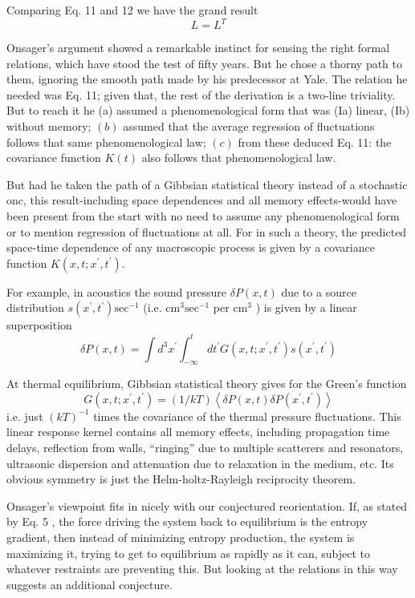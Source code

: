 \documentclass{article}
\begin{document}
Comparing Eq. 11 and 12 we have the grand result
$$
L=L^T
$$

Onsager's argument showed a remarkable instinct for sensing the right formal relations, which have stood the test of fifty years. But he chose a thorny path to them, ignoring the smooth path made by his predecessor at Yale. The relation he needed was Eq. 11; given that, the rest of the derivation is a two-line triviality. But to reach it he (a) assumed a phenomenological form that was (Ia) linear, (Ib) without memory; $(b)$ assumed that the average regression of fluctuations follows that same phenomenological law; $(c)$ from these deduced Eq. 11: the covariance function $K(t)$ also follows that phenomenological law.

But had he taken the path of a Gibbsian statistical theory instead of a stochastic onc, this result-including space dependences and all memory effects-would have been present from the start with no need to assume any phenomenological form or to mention regression of fluctuations at all. For in such a theory, the predicted space-time dependence of any macroscopic process is given by a covariance function $K\left(x, t ; x^{\prime}, t^{\prime}\right)$.

For example, in acoustics the sound pressure $\delta P(x, t)$ due to a source distribution $s\left(x^{\prime}, t^{\prime}\right) \mathrm{sec}^{-1}$ (i.e. $\mathrm{cm}^3 \mathrm{sec}^{-1}$ per $\mathrm{cm}^3$ ) is given by a linear superposition
$$
\delta P(x, t)=\int d^3 x^{\prime} \int_{-\infty}^t d t^{\prime} G\left(x, t ; x^{\prime}, t^{\prime}\right) s\left(x^{\prime}, t^{\prime}\right)
$$

At thermal equilibrium, Gibbsian statistical theory gives for the Green's function
$$
G\left(x, t ; x^{\prime}, t^{\prime}\right)=(1 / k T)\left\langle\delta P(x, t) \delta P\left(x^{\prime}, t^{\prime}\right)\right\rangle
$$
i.e. just $(k T)^{-1}$ times the covariance of the thermal pressure fluctuations. This linear response kernel contains all memory effects, including propagation time delays, reflection from walls, ``ringing'' due to multiple scatterers and resonators, ultrasonic dispersion and attenuation due to relaxation in the medium, etc. Its obvious symmetry is just the Helm-holtz-Rayleigh reciprocity theorem.

Onsager's viewpoint fits in nicely with our conjectured reorientation. If, as stated by Eq. 5 , the force driving the system back to equilibrium is the entropy gradient, then instead of minimizing entropy production, the system is maximizing it, trying to get to equilibrium as rapidly as it can, subject to whatever restraints are preventing this. But looking at the relations in this way suggests an additional conjecture.
\end{document}

